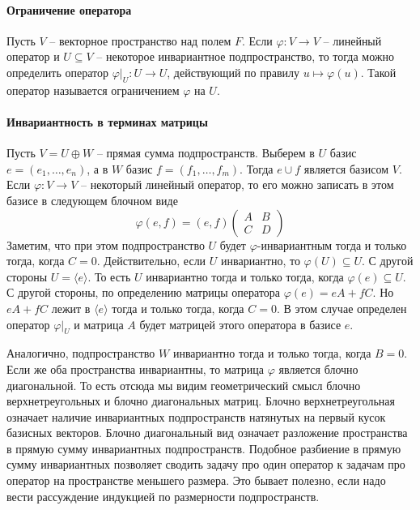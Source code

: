 \paragraph{Ограничение оператора} 

\begin{definition}
Пусть $V$ -- векторное пространство над полем $F$.
Если $\varphi \colon V\to V$ -- линейный оператор и $U\subseteq V$ -- некоторое инвариантное подпространство, то тогда можно определить оператор $\varphi|_U\colon U\to U$, действующий по правилу $u\mapsto \varphi(u)$.
Такой оператор называется ограничением $\varphi$ на $U$.
\end{definition}

\paragraph{Инвариантность в терминах матрицы}

Пусть $V = U \oplus W$ -- прямая сумма подпространств.
Выберем в $U$ базис $e=(e_1,\ldots,e_n)$, а в $W$ базис $f = (f_1,\ldots,f_m)$.
Тогда $e \cup f$ является базисом $V$.
Если $\varphi \colon V \to V$ -- некоторый линейный оператор, то его можно записать в этом базисе в следующем блочном виде
\[
\varphi (e, f) = (e, f)
\begin{pmatrix}
{A}&{B}\\
{C}&{D}
\end{pmatrix}
\]
Заметим, что при этом подпространство $U$ будет $\varphi$-инвариантным тогда и только тогда, когда $C = 0$.
Действительно, если $U$ инвариантно, то $\varphi(U)\subseteq U$.
С другой стороны $U = \langle e \rangle$.
То есть $U$ инвариантно тогда и только тогда, когда $\varphi(e) \subseteq U$.
С другой стороны, по определению матрицы оператора $\varphi (e) = eA + fC$.
Но $eA + fC$ лежит в $\langle e\rangle$ тогда и только тогда, когда $C = 0$.
В этом случае определен оператор $\varphi|_U$ и матрица $A$ будет матрицей этого оператора в базисе $e$.

Аналогично, подпространство $W$ инвариантно тогда и только тогда, когда $B = 0$.
Если же оба пространства инвариантны, то матрица $\varphi$ является блочно диагональной.
То есть отсюда мы видим геометрический смысл блочно верхнетреугольных и блочно диагональных матриц.
Блочно верхнетреугольная означает наличие инвариантных подпространств натянутых на первый кусок базисных векторов.
Блочно диагональный вид означает разложение пространства в прямую сумму инвариантных подпространств.
Подобное разбиение в прямую сумму инвариантных позволяет сводить задачу про один оператор к задачам про оператор на пространстве меньшего размера.
Это бывает полезно, если надо вести рассуждение индукцией по размерности подпространств.

